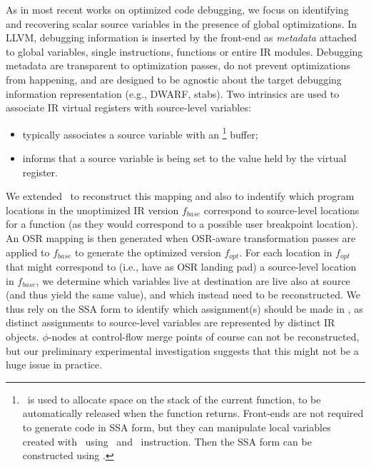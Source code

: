 As in most recent works on optimized code debugging, we focus on identifying and recovering scalar source variables in the presence of global optimizations. In LLVM, debugging information is inserted by the front-end as {\em metadata} attached to global variables, single instructions, functions or entire IR modules. Debugging metadata are transparent to optimization passes, do not prevent optimizations from happening, and are designed to be agnostic about the target debugging information representation (e.g., DWARF, stabs). Two intrinsics are used to associate IR virtual registers with source-level variables:
\begin{itemize}[itemsep=0pt,parsep=3pt]
 \item {} typically associates a source variable with an \alloca\footnote{\alloca\ is used to allocate space on the stack of the current function, to be automatically released when the function returns. Front-ends are not required to generate code in SSA form, but they can manipulate local variables created with \alloca\ using \load\ and \store\ instruction. Then the SSA form can be constructed using \memtoreg.} buffer;
 \item {} informs that a source variable is being set to the value held by the virtual register.
\end{itemize}

\noindent We extended \tinyvm\ to reconstruct this mapping and also to indentify which program locations in the unoptimized IR version $f_{base}$ correspond to source-level locations for a function (as they would correspond to a possible user breakpoint location). An OSR mapping is then generated when OSR-aware transformation passes are applied to $f_{base}$ to generate the optimized version $f_{opt}$. For each location in $f_{opt}$ that might correspond to (i.e., have as OSR landing pad) a source-level location in $f_{base}$, we determine which variables live at destination are live also at source (and thus yield the same value), and which instead need to be reconstructed. We thus rely on the SSA form to identify which assignment(s) should be made in \reconstruct, as distinct assignments to source-level variables are represented by distinct IR objects. $\phi$-nodes at control-flow merge points of course can not be reconstructed, but our preliminary experimental investigation suggests that this might not be a huge issue in practice.



